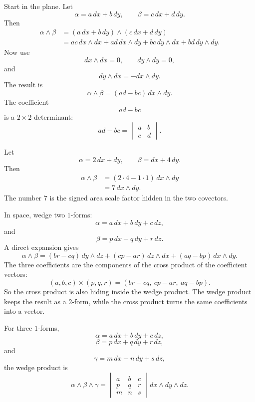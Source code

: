 Start in the plane.  Let
\[
    \alpha=a\,dx+b\,dy,
    \qquad
    \beta=c\,dx+d\,dy.
\]
Then
\[
\begin{aligned}
    \alpha\wedge\beta
    &=
    (a\,dx+b\,dy)\wedge(c\,dx+d\,dy)\\
    &=
    ac\,dx\wedge dx
    +ad\,dx\wedge dy
    +bc\,dy\wedge dx
    +bd\,dy\wedge dy.
\end{aligned}
\]
Now use
\[
    dx\wedge dx=0,
    \qquad
    dy\wedge dy=0,
\]
and
\[
    dy\wedge dx=-dx\wedge dy.
\]
The result is
\[
\boxed{
    \alpha\wedge\beta=(ad-bc)\,dx\wedge dy.
}
\]
The coefficient
\[
    ad-bc
\]
is a \(2\times2\) determinant:
\[
\boxed{
    ad-bc
    =
    \begin{vmatrix}
        a&b\\
        c&d
    \end{vmatrix}.
}
\]

\begin{example}
Let
\[
    \alpha=2\,dx+dy,
    \qquad
    \beta=dx+4\,dy.
\]
Then
\[
\begin{aligned}
    \alpha\wedge\beta
    &=
    (2\cdot4-1\cdot1)\,dx\wedge dy\\
    &=
    7\,dx\wedge dy.
\end{aligned}
\]
The number \(7\) is the signed area scale factor hidden in the two covectors.
\end{example}

In space, wedge two \(1\)-forms:
\[
    \alpha=a\,dx+b\,dy+c\,dz,
\]
and
\[
    \beta=p\,dx+q\,dy+r\,dz.
\]
A direct expansion gives
\[
\boxed{
    \alpha\wedge\beta
    =
    (br-cq)\,dy\wedge dz
    +
    (cp-ar)\,dz\wedge dx
    +
    (aq-bp)\,dx\wedge dy.
}
\]
The three coefficients are the components of the cross product of the coefficient
vectors:
\[
    (a,b,c)\times(p,q,r)
    =
    (br-cq,\ cp-ar,\ aq-bp).
\]
So the cross product is also hiding inside the wedge product.  The wedge product keeps
the result as a \(2\)-form, while the cross product turns the same coefficients into a
vector.

For three \(1\)-forms,
\[
    \alpha=a\,dx+b\,dy+c\,dz,
\]
\[
    \beta=p\,dx+q\,dy+r\,dz,
\]
and
\[
    \gamma=m\,dx+n\,dy+s\,dz,
\]
the wedge product is
\[
\boxed{
    \alpha\wedge\beta\wedge\gamma
    =
    \begin{vmatrix}
        a&b&c\\
        p&q&r\\
        m&n&s
    \end{vmatrix}
    dx\wedge dy\wedge dz.
}
\]

